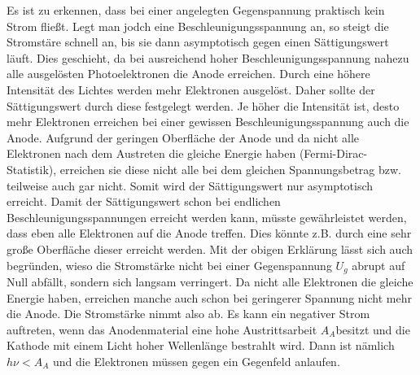 Es ist zu erkennen, dass bei einer angelegten Gegenspannung praktisch kein Strom fließt. Legt man
jodch eine Beschleunigungsspannung an, so steigt die Stromstäre schnell an, bis sie dann
asymptotisch gegen einen Sättigungswert läuft.
Dies geschieht, da bei ausreichend hoher Beschleunigungsspannung nahezu alle ausgelösten
Photoelektronen die Anode erreichen. Durch eine höhere Intensität des Lichtes werden mehr
Elektronen ausgelöst. Daher sollte der Sättigungswert durch diese festgelegt werden. Je höher
die Intensität ist, desto mehr Elektronen erreichen bei einer gewissen Beschleunigungsspannung
auch die Anode.
Aufgrund der geringen Oberfläche der Anode und da nicht alle Elektronen nach dem Austreten die gleiche Energie haben (Fermi-Dirac-Statistik), erreichen sie diese
nicht alle bei dem gleichen Spannungsbetrag bzw. teilweise auch gar nicht. Somit wird der Sättigungswert nur asymptotisch erreicht.
Damit der Sättigungswert schon bei endlichen Beschleunigungsspannungen erreicht werden kann, müsste gewährleistet werden, dass eben
alle Elektronen auf die Anode treffen. Dies könnte z.B. durch eine sehr große Oberfläche dieser erreicht werden.
Mit der obigen Erklärung lässt sich auch begründen, wieso die Stromstärke nicht bei einer Gegenspannung $U_g$ abrupt auf Null abfällt, sondern
sich langsam verringert. Da nicht alle Elektronen die gleiche Energie haben, erreichen manche auch schon bei geringerer Spannung nicht mehr
die Anode. Die Stromstärke nimmt also ab.
Es kann ein negativer Strom auftreten, wenn das Anodenmaterial eine hohe Austrittsarbeit $A_A$besitzt und die Kathode mit einem Licht hoher
Wellenlänge bestrahlt wird. Dann ist nämlich $h\nu<A_A$ und die Elektronen müssen gegen ein Gegenfeld anlaufen.
